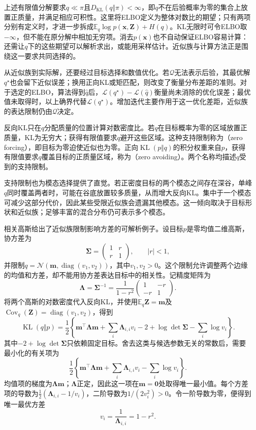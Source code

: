 上述有限值分解要求$q\ll\pi$且$D_{\mathrm{KL}}(q\Vert\pi)<\infty$，即$q$不在后验概率为零的集合上放置正质量，并满足相应可积性。这里将ELBO定义为整体对数比的期望；只有两项分别有定义时，才进一步拆成$\mathbb E_q\log p(\bm x,\bm Z)+H(q)$。KL无限时可令ELBO取$-\infty$，但不能在原分解中相加无穷项。消去$p(\bm x)$也不自动保证ELBO容易计算：还需让$q$下的这些期望可以解析求出，或能用采样估计。近似族与计算方法正是围绕这一要求共同选择的。

从近似族到实际解，还要经过目标选择和数值优化。若$\mathcal Q$无法表示后验，其最优解$q^\star$也会留下近似误差；换用正向KL或矩匹配，则改变了衡量分布差距的准则。对于选定的ELBO，算法得到$\widehat q$后，$\mathcal L(q^\star)-\mathcal L(\widehat q)$衡量尚未消除的优化误差；最优值未取得时，以上确界代替$\mathcal L(q^\star)$。增加迭代主要作用于这一优化差距，近似族的表达限制仍由$\mathcal Q$决定。

反向KL只在$q$分配质量的位置计算对数密度比。若$q$在目标概率为零的区域放置正质量，KL为无穷大；获得有限值要求$q$避开这些区域。这种支持限制称为（zero forcing），即目标为零迫使近似也为零。正向$\operatorname{KL}(p\Vert q)$的积分权重来自$p$，获得有限值要求$q$覆盖目标的正质量区域，称为（zero avoiding）。两个名称均描述$q$受到的支持限制。

支持限制也为模态选择提供了直觉。若正密度目标的两个模态之间存在深谷，单峰$q$同时覆盖两者时，可能在谷底放置较多质量，从而增大反向KL。集中于一个模态可减少这部分代价，因此某些受限近似族会遗漏其他模态。这一倾向取决于目标形状和近似族；足够丰富的混合分布仍可表示多个模态。

相关高斯给出了近似族限制影响方差的可解析例子。设目标$p$是零均值二维高斯，协方差为
\[
  \bm{\Sigma}=
  \begin{pmatrix}1&r\\r&1\end{pmatrix},
  \qquad |r|<1,
\]
并限制$q=\mathcal N(\bm{m},\operatorname{diag}(v_1,v_2))$，其中$v_1,v_2>0$。这个限制允许调整两个边缘的均值和方差，却不能用协方差表达目标中的相关性。记精度矩阵为
\[
  \bm\Lambda=\bm\Sigma^{-1}
    =\frac{1}{1-r^2}
      \begin{pmatrix}1&-r\\-r&1\end{pmatrix}.
\]
将两个高斯的对数密度代入反向KL，并使用$\mathbb E_q\bm Z=\bm m$及$\operatorname{Cov}_q(\bm Z)=\operatorname{diag}(v_1,v_2)$，得到
\[
  \operatorname{KL}(q\Vert p)
    =\frac12\left\{
       \bm m^\top\bm\Lambda\bm m
       +\sum_i\bm\Lambda_{i,i}v_i-2
       +\log\det\bm\Sigma-\sum_i\log v_i\right\}.
\]
其中$-2+\log\det\bm\Sigma$只依赖固定目标。舍去这类与候选参数无关的常数后，需要最小化的有关项为
\[
  \frac12\left\{\bm{m}^{\top}\bm{\Lambda}\bm{m}
     +\sum_i\bm{\Lambda}_{i,i}v_i-\sum_i\log v_i\right\}.
\]
均值项的梯度为$\bm\Lambda\bm m$；$\bm\Lambda$正定，因此这一项在$\bm m=\bm0$处取得唯一最小值。每个方差项的导数为$\tfrac12(\bm\Lambda_{i,i}-1/v_i)$，二阶导数为$1/(2v_i^2)>0$。令一阶导数为零，便得到唯一最优方差
\[
  v_i=\frac{1}{\bm\Lambda_{i,i}}=1-r^2.
\]

